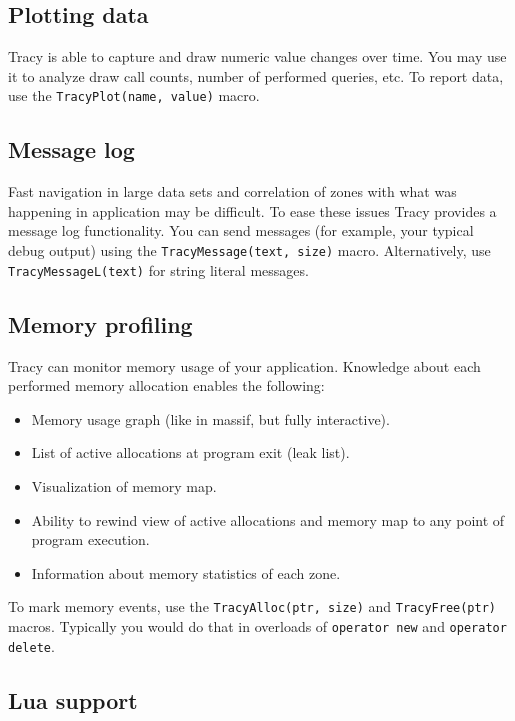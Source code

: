 \documentclass[hidelinks,titlepage,a4paper]{article}
\begin{document}
\subsection{Plotting data}

Tracy is able to capture and draw numeric value changes over time. You may use it to analyze draw call counts, number of performed queries, etc. To report data, use the \texttt{TracyPlot(name, value)} macro.

\subsection{Message log}

Fast navigation in large data sets and correlation of zones with what was happening in application may be difficult. To ease these issues Tracy provides a message log functionality. You can send messages (for example, your typical debug output) using the \texttt{TracyMessage(text, size)} macro. Alternatively, use \texttt{TracyMessageL(text)} for string literal messages.

\subsection{Memory profiling}

Tracy can monitor memory usage of your application. Knowledge about each performed memory allocation enables the following:

\begin{itemize}
\item Memory usage graph (like in massif, but fully interactive).
\item List of active allocations at program exit (leak list).
\item Visualization of memory map.
\item Ability to rewind view of active allocations and memory map to any point of program execution.
\item Information about memory statistics of each zone.
\end{itemize}

To mark memory events, use the \texttt{TracyAlloc(ptr, size)} and \texttt{TracyFree(ptr)} macros. Typically you would do that in overloads of \texttt{operator new} and \texttt{operator delete}.

\subsection{Lua support}
\end{document}
